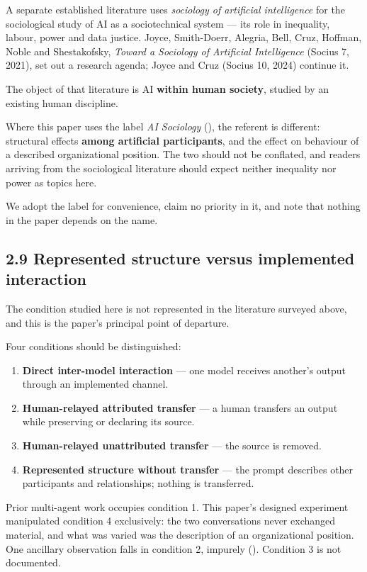\gcheck{} A separate established literature uses \emph{sociology of artificial intelligence} for the sociological study of AI as a sociotechnical system — its role in inequality, labour, power and data justice. Joyce, Smith-Doerr, Alegria, Bell, Cruz, Hoffman, Noble and Shestakofsky, \emph{Toward a Sociology of Artificial Intelligence} (Socius 7, 2021), set out a research agenda; Joyce and Cruz (Socius 10, 2024) continue it.
\nocite{joyce2021sociology,joyce2024sociology}

The object of that literature is AI \textbf{within human society}, studied by an existing human discipline.

Where this paper uses the label \emph{AI Sociology} (), the referent is different: structural effects \textbf{among artificial participants}, and the effect on behaviour of a described organizational position. The two should not be conflated, and readers arriving from the sociological literature should expect neither inequality nor power as topics here.

We adopt the label for convenience, claim no priority in it, and note that nothing in the paper depends on the name.


\subsection*{2.9 Represented structure versus implemented interaction}
\label{sec:en:2.9}

The condition studied here is not represented in the literature surveyed above, and this is the paper's principal point of departure.

Four conditions should be distinguished:

\begin{enumerate}
  \item \textbf{Direct inter-model interaction} — one model receives another's output through an implemented channel.
  \item \textbf{Human-relayed attributed transfer} — a human transfers an output while preserving or declaring its source.
  \item \textbf{Human-relayed unattributed transfer} — the source is removed.
  \item \textbf{Represented structure without transfer} — the prompt describes other participants and relationships; nothing is transferred.
\end{enumerate}
Prior multi-agent work occupies condition 1. This paper's designed experiment manipulated condition 4 exclusively: the two conversations never exchanged material, and what was varied was the description of an organizational position. One ancillary observation falls in condition 2, impurely (). Condition 3 is not documented.

